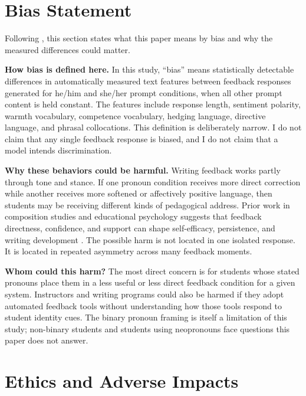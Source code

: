 \documentclass[11pt,a4paper]{article}
\begin{document}
\section{Bias Statement}
\label{sec:bias-statement}

Following \citet{blodgett2020language}, this section states what this paper means by bias and why the measured differences could matter.

\textbf{How bias is defined here.} In this study, ``bias'' means statistically detectable differences in automatically measured text features between feedback responses generated for he/him and she/her prompt conditions, when all other prompt content is held constant. The features include response length, sentiment polarity, warmth vocabulary, competence vocabulary, hedging language, directive language, and phrasal collocations. This definition is deliberately narrow. I do not claim that any single feedback response is biased, and I do not claim that a model intends discrimination.

\textbf{Why these behaviors could be harmful.} Writing feedback works partly through tone and stance. If one pronoun condition receives more direct correction while another receives more softened or affectively positive language, then students may be receiving different kinds of pedagogical address. Prior work in composition studies and educational psychology suggests that feedback directness, confidence, and support can shape self-efficacy, persistence, and writing development \citep{sommers1982responding,harber2012positive}. The possible harm is not located in one isolated response. It is located in repeated asymmetry across many feedback moments.

\textbf{Whom could this harm?} The most direct concern is for students whose stated pronouns place them in a less useful or less direct feedback condition for a given system. Instructors and writing programs could also be harmed if they adopt automated feedback tools without understanding how those tools respond to student identity cues. The binary pronoun framing is itself a limitation of this study; non-binary students and students using neopronouns face questions this paper does not answer.

\section{Ethics and Adverse Impacts}
\label{sec:ethics}
\end{document}
